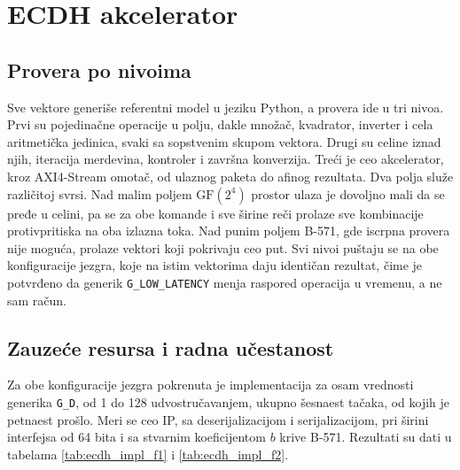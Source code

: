 \section{ECDH akcelerator}
\label{sec:rez_ecdh}

\subsection{Provera po nivoima}
\label{subsec:rez_ecdh_provera}

Sve vektore generiše referentni model u jeziku Python, a provera ide u tri nivoa. Prvi su pojedinačne operacije u polju, dakle množač, kvadrator, inverter i cela aritmetička jedinica, svaki sa sopstvenim skupom vektora. Drugi su celine iznad njih, iteracija merdevina, kontroler i završna konverzija. Treći je ceo akcelerator, kroz AXI4-Stream omotač, od ulaznog paketa do afinog rezultata.
\smallbreak
Dva polja služe različitoj svrsi. Nad malim poljem $\mathrm{GF}(2^4)$ prostor ulaza je dovoljno mali da se pređe u celini, pa se za obe komande i sve širine reči prolaze sve kombinacije protivpritiska na oba izlazna toka. Nad punim poljem B-571, gde iscrpna provera nije moguća, prolaze vektori koji pokrivaju ceo put. Svi nivoi puštaju se na obe konfiguracije jezgra, koje na istim vektorima daju identičan rezultat, čime je potvrđeno da generik \texttt{G\_LOW\_LATENCY} menja raspored operacija u vremenu, a ne sam račun.

\subsection{Zauzeće resursa i radna učestanost}
\label{subsec:rez_ecdh_resursi}

Za obe konfiguracije jezgra pokrenuta je implementacija za osam vrednosti generika \texttt{G\_D}, od 1 do 128 udvostručavanjem, ukupno šesnaest tačaka, od kojih je petnaest prošlo. Meri se ceo IP, sa deserijalizacijom i serijalizacijom, pri širini interfejsa od 64 bita i sa stvarnim koeficijentom $b$ krive B-571. Rezultati su dati u tabelama \ref{tab:ecdh_impl_f1} i \ref{tab:ecdh_impl_f2}.

\begin{table}[H]
\caption{Osnovno ECDH jezgro, implementacija van konteksta}
\centering
{\renewcommand{\arraystretch}{1.25}
}
\label{tab:ecdh_impl_f1}
\end{table}


